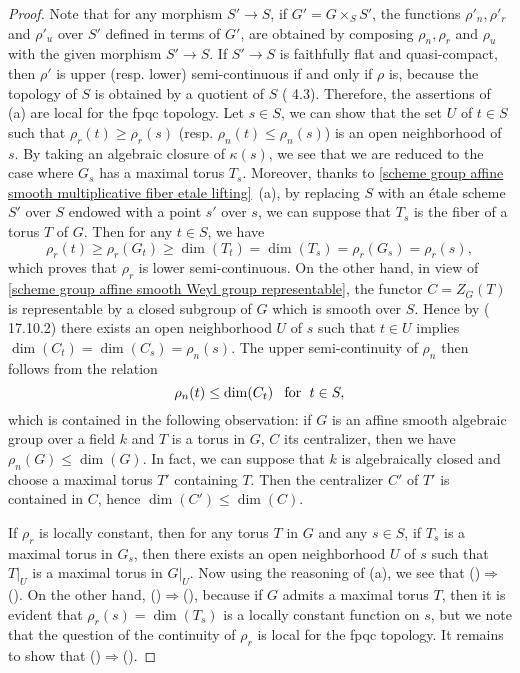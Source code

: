 \begin{proof}
Note that for any morphism $S'\to S$, if $G'=G\times_SS'$, the functions $\rho'_n,\rho'_r$ and $\rho'_u$ over $S'$ defined in terms of $G'$, are obtained by composing $\rho_n,\rho_r$ and $\rho_u$ with the given morphism $S'\to S$. If $S'\to S$ is faithfully flat and quasi-compact, then $\rho'$ is upper (resp. lower) semi-continuous if and only if $\rho$ is, because the topology of $S$ is obtained by a quotient of $S$ (\cite{SGA1}  4.3). Therefore, the assertions of (a) are local for the fpqc topology. Let $s\in S$, we can show that the set $U$ of $t\in S$ such that $\rho_r(t)\geq\rho_r(s)$ (resp. $\rho_n(t)\leq\rho_n(s)$) is an open neighborhood of $s$. By taking an algebraic closure of $\kappa(s)$, we see that we are reduced to the case where $G_s$ has a maximal torus $T_s$. Moreover, thanks to \cref{scheme group affine smooth multiplicative fiber etale lifting}~(a), by replacing $S$ with an \'etale scheme $S'$ over $S$ endowed with a point $s'$ over $s$, we can suppose that $T_s$ is the fiber of a torus $T$ of $G$. Then for any $t\in S$, we have
\[\rho_r(t)\geq\rho_r(G_t)\geq\dim(T_t)=\dim(T_s)=\rho_r(G_s)=\rho_r(s),\]
which proves that $\rho_r$ is lower semi-continuous. On the other hand, in view of \cref{scheme group affine smooth Weyl group representable}, the functor $C=Z_G(T)$ is representable by a closed subgroup of $G$ which is smooth over $S$. Hence by (\cite{EGA4-4} 17.10.2) there exists an open neighborhood $U$ of $s$ such that $t\in U$ implies $\dim(C_t)=\dim(C_s)=\rho_n(s)$. The upper semi-continuity of $\rho_n$ then follows from the relation
\[\rho_n(t)\leq\dim(C_t)\hspace{8pt}\text{for}\hspace{6pt} t\in S,\]
which is contained in the following observation: if $G$ is an affine smooth algebraic group over a field $k$ and $T$ is a torus in $G$, $C$ its centralizer, then we have $\rho_n(G)\leq\dim(G)$. In fact, we can suppose that $k$ is algebraically closed and choose a maximal torus $T'$ containing $T$. Then the centralizer $C'$ of $T'$ is contained in $C$, hence $\dim(C')\leq\dim(C)$.\par
If $\rho_r$ is locally constant, then for any torus $T$ in $G$ and any $s\in S$, if $T_s$ is a maximal torus in $G_s$, then there exists an open neighborhood $U$ of $s$ such that $T|_U$ is a maximal torus in $G|_U$. Now using the reasoning of (a), we see that ()$\Rightarrow$(). On the other hand, ()$\Rightarrow$(), because if $G$ admits a maximal torus $T$, then it is evident that $\rho_r(s)=\dim(T_s)$ is a locally constant function on $s$, but we note that the question of the continuity of $\rho_r$ is local for the fpqc topology. It remains to show that ()$\Rightarrow$().\par

\end{proof}
